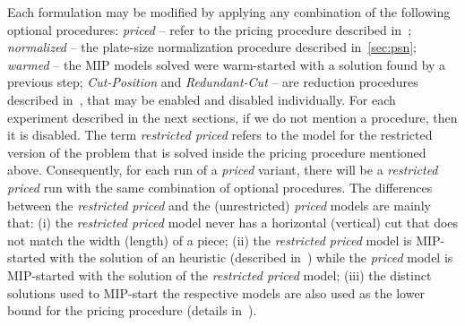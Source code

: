 \documentclass[smallextended]{svjour3}       %
\begin{document}
Each formulation may be modified by applying any combination of the following optional procedures:
\emph{priced} -- refer to the pricing procedure described in~\cite{furini:2016,dimitri_thesis};
\emph{normalized} -- the plate-size normalization procedure described in~\autoref{sec:psn};
\emph{warmed} -- the MIP models solved were warm-started with a solution found by a previous step;
\emph{Cut-Position} and \emph{Redundant-Cut} -- are reduction procedures described in~\cite{furini:2016,dimitri_thesis}, that may be enabled and disabled individually.
For each experiment described in the next sections, if we do not mention a procedure, then it is disabled.
The term \emph{restricted priced} refers to the model for the restricted version of the problem that is solved inside the pricing procedure mentioned above.
Consequently, for each run of a \emph{priced} variant, there will be a \emph{restricted priced} run with the same combination of optional procedures.
The differences between the \emph{restricted priced} and the (unrestricted) \emph{priced} models are mainly that:
(i) the \emph{restricted priced} model never has a horizontal (vertical) cut that does not match the width (length) of a piece;
(ii) the \emph{restricted priced} model is MIP-started with the solution of an heuristic (described in~\cite{furini:2016}) while the \emph{priced} model is MIP-started with the solution of the \emph{restricted priced} model;
(iii) the distinct solutions used to MIP-start the respective models are also used as the lower bound for the pricing procedure (details in~\cite{furini:2016}).
\end{document}
